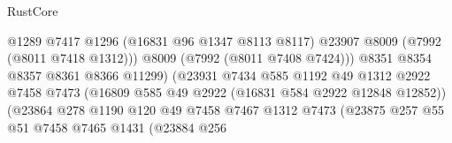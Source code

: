 \begin{lexlean}{RustCore}
\begin{coremodule}
                                                  @1289
                                                  @7417
                                                  @1296
                                                  (@16831 @96 @1347 @8113 @8117)
                                                  @23907
                                                  @8009
                                                  (@7992 (@8011 @7418 @1312)))
                                                @8009
                                                (@7992 (@8011 @7408 @7424)))
                                              @8351
                                              @8354
                                              @8357
                                              @8361
                                              @8366
                                              @11299)
                                            (@23931
                                              @7434
                                              @585
                                              @1192
                                              @49
                                              @1312
                                              @2922
                                              @7458
                                              @7473
                                              (@16809
                                                @585
                                                @49
                                                @2922
                                                (@16831 @584 @2922 @12848 @12852))
                                              (@23864
                                                @278
                                                @1190
                                                @120
                                                @49
                                                @7458
                                                @7467
                                                @1312
                                                @7473
                                                (@23875
                                                  @257
                                                  @55
                                                  @51
                                                  @7458
                                                  @7465
                                                  @1431
                                                  (@23884
                                                    @256

\end{coremodule}
\end{lexlean}
